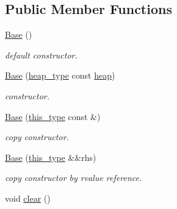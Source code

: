 \subsection*{Public Member Functions}
\begin{DoxyCompactItemize}
\item 
\hypertarget{classhryky_1_1parser_1_1_base_a5ffe0568374d8b9b4c4ec32953fd6453}{\hyperlink{classhryky_1_1parser_1_1_base_a5ffe0568374d8b9b4c4ec32953fd6453}{Base} ()}\label{classhryky_1_1parser_1_1_base_a5ffe0568374d8b9b4c4ec32953fd6453}

\begin{DoxyCompactList}\small\item\em default constructor. \end{DoxyCompactList}\item 
\hypertarget{classhryky_1_1parser_1_1_base_ae4a18c6bd5f5f323df696bbed4aa6b97}{\hyperlink{classhryky_1_1parser_1_1_base_ae4a18c6bd5f5f323df696bbed4aa6b97}{Base} (\hyperlink{classhryky_1_1memory_1_1heap_1_1_base}{heap\-\_\-type} const \hyperlink{classhryky_1_1parser_1_1_base_ade0723cedb648d9850423cc04fe4bdcf}{heap})}\label{classhryky_1_1parser_1_1_base_ae4a18c6bd5f5f323df696bbed4aa6b97}

\begin{DoxyCompactList}\small\item\em constructor. \end{DoxyCompactList}\item 
\hypertarget{classhryky_1_1parser_1_1_base_a663fa22bf8197e0acf1adc4ff4f74cd8}{\hyperlink{classhryky_1_1parser_1_1_base_a663fa22bf8197e0acf1adc4ff4f74cd8}{Base} (\hyperlink{classhryky_1_1parser_1_1_base_af5836311fb3f235ddc6e08809ca2ad68}{this\-\_\-type} const \&)}\label{classhryky_1_1parser_1_1_base_a663fa22bf8197e0acf1adc4ff4f74cd8}

\begin{DoxyCompactList}\small\item\em copy constructor. \end{DoxyCompactList}\item 
\hypertarget{classhryky_1_1parser_1_1_base_a09ce91786e009adb52fcf031bdb249e6}{\hyperlink{classhryky_1_1parser_1_1_base_a09ce91786e009adb52fcf031bdb249e6}{Base} (\hyperlink{classhryky_1_1parser_1_1_base_af5836311fb3f235ddc6e08809ca2ad68}{this\-\_\-type} \&\&rhs)}\label{classhryky_1_1parser_1_1_base_a09ce91786e009adb52fcf031bdb249e6}

\begin{DoxyCompactList}\small\item\em copy constructor by rvalue reference. \end{DoxyCompactList}\item 
\hypertarget{classhryky_1_1parser_1_1_base_a135bce05655e290c78fa83196199a576}{void \hyperlink{classhryky_1_1parser_1_1_base_a135bce05655e290c78fa83196199a576}{clear} ()}\label{classhryky_1_1parser_1_1_base_a135bce05655e290c78fa83196199a576}


\end{DoxyCompactItemize}
